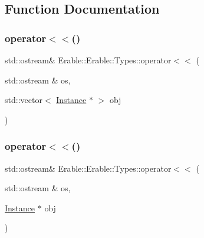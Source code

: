 \subsection{Function Documentation}
\mbox{\label{namespace_erable_1_1_erable_1_1_types_a79c4205df15e52d78f26cc623c1170db}} 
\subsubsection{\texorpdfstring{operator$<$$<$()}{operator<<()}\hspace{0.1cm}{\footnotesize\ttfamily [1/2]}}
{\footnotesize\ttfamily std\+::ostream\& Erable\+::\+Erable\+::\+Types\+::operator$<$$<$ (\begin{DoxyParamCaption}\item[{std\+::ostream \&}]{os,  }\item[{std\+::vector$<$ \mbox{\hyperlink{class_erable_1_1_erable_1_1_types_1_1_instance}{Instance}} $\ast$ $>$}]{obj }\end{DoxyParamCaption})}

\mbox{\label{namespace_erable_1_1_erable_1_1_types_a416026fb846690591620fe9ef9393567}} 
\subsubsection{\texorpdfstring{operator$<$$<$()}{operator<<()}\hspace{0.1cm}{\footnotesize\ttfamily [2/2]}}
{\footnotesize\ttfamily std\+::ostream\& Erable\+::\+Erable\+::\+Types\+::operator$<$$<$ (\begin{DoxyParamCaption}\item[{std\+::ostream \&}]{os,  }\item[{\mbox{\hyperlink{class_erable_1_1_erable_1_1_types_1_1_instance}{Instance}} $\ast$}]{obj }\end{DoxyParamCaption})}


